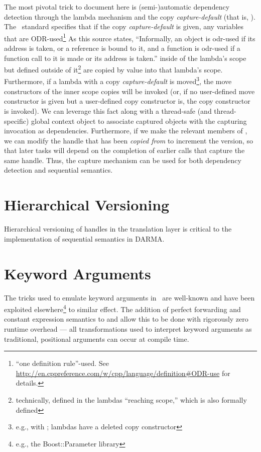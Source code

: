 The most pivotal trick to document here is (semi-)automatic dependency detection
through the  lambda mechanism and the copy {\it capture-default} (that is,
\inlinecode{[=]}).  The \CC\ standard specifies that if the copy
{\it capture-default} is given, any variables that are ODR-used\footnote{``one
definition rule''-used.  See
\url{http://en.cppreference.com/w/cpp/language/definition\#ODR-use} for
details.} 
As this source states, ``Informally, an object is odr-used if its address is
taken, or a reference is bound to it, and a function is odr-used if a function
call to it is made or its address is taken.'' inside of the lambda's scope but
defined outside of it\footnote{technically, defined in the lambdas
``reaching scope,'' which is also formally defined} are copied by value into
that lambda's scope.  Furthermore, if a lambda with a copy {\it capture-default}
is moved\footnote{e.g., with ; lambdas have a deleted
copy constructor}, the move constructors of the inner scope copies will be
invoked (or, if no user-defined move constructor is given but a user-defined
copy constructor is, the copy constructor is invoked).  We can leverage this
fact along with a thread-safe (and thread-specific) global context object to
associate captured  objects with the capturing
 invocation as dependencies.  Furthermore, if we
make the relevant members of  ,
we can modify the handle that has been {\it copied from} to increment the
version, so that later tasks will depend on the completion of earlier
 calls that capture the same handle.  Thus, the capture
mechanism can be used for both dependency detection and sequential semantics.

\section{Hierarchical Versioning}

Hierarchical versioning of handles in the translation layer is critical to the
implementation of sequential semantics in DARMA. 

\section{Keyword Arguments}

The tricks used to emulate keyword arguments in \CC\ are well-known and have been
exploited elsewhere\footnote{e.g., the Boost::Parameter library} to similar
effect.  The addition of perfect forwarding and constant expression semantics to
 and  allow this to be done with rigorously zero runtime overhead ---
all transformations used to interpret keyword arguments as traditional,
positional arguments can occur at compile time.

